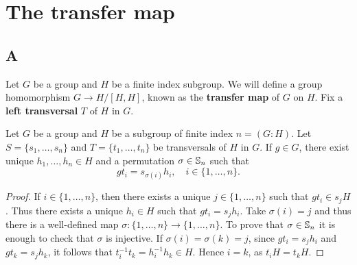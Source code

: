 \chapter{The transfer map}


\section*{A}

Let $G$ be a group and $H$ be a finite index subgroup. We will define
a group homomorphism $G\to H/[H,H]$, known as the \textbf{transfer map} of $G$
on $H$. Fix a \textbf{left transversal} $T$ of $H$ in $G$.

\begin{lemma}
	\label{lem:sigma}
	Let $G$ be a group and $H$ be a subgroup of finite index $n=(G:H)$. Let
	$S=\{s_1,\dots,s_n\}$ and $T=\{t_1,\dots,t_n\}$ be transversals of $H$ in $G$.
	If $g\in G$, there exist unique $h_1,\dots,h_n\in H$ and a permutation 
	$\sigma\in\mathbb{S}_n$  
	such that
		\[
		gt_i=s_{\sigma(i)}h_i,\quad
		i\in\{1,\dots,n\}.
	\]
\end{lemma}

\begin{proof}
	If $i\in\{1,\dots,n\}$, then there exists a unique $j\in\{1,\dots,n\}$ such that $gt_i\in
	s_jH$. Thus there exists a unique $h_i\in H$ such that $gt_i=s_jh_i$. Take 
	$\sigma(i)=j$ and thus there is a well-defined map 
	$\sigma\colon\{1,\dots,n\}\to\{1,\dots,n\}$.  To prove that 
	$\sigma\in\mathbb{S}_n$ it is enough to check that $\sigma$ is injective. If
	$\sigma(i)=\sigma(k)=j$, since $gt_i=s_jh_i$ and $gt_k=s_jh_k$, it follows that 
	$t_i^{-1}t_k=h_i^{-1}h_k\in H$. Hence $i=k$, as $t_iH=t_kH$.
\end{proof}

%
%
%


